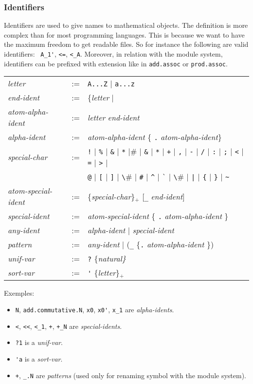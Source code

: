 \subsubsection*{Identifiers}

Identifiers are used to give names to mathematical objects. The definition is
more complex than for most programming languages. This is because we want to
have the maximum freedom to get readable files. So for instance the following
are valid identifiers: \verb# A_1'#, \verb#<=#, \verb#<_A#. Moreover, in
relation with the module system, identifiers can be prefixed with extension
like in \verb#add.assoc# or \verb#prod.assoc#.

\begin{tabular}{lcl}
{\it letter} &:=& \verb#A...Z# $|$ \verb#a...z#
\\
{\it end-ident}&:=&\{{\it letter} $|$ \verb#0...9# $|$ \verb#_# \} \{ \verb#'# \}
\\
{\it atom-alpha-ident} &:=& {\it letter} {\it end-ident} 
\\
{\it alpha-ident} &:=& {\it atom-alpha-ident} \{ \verb#.# {\it
  atom-alpha-ident}\}
\\
{\it special-char} &:=& \verb#!# $|$ \verb#%# $|$ \verb#&# $|$ \verb#*# $|$
  \verb#+# $|$ \verb#,# $|$ \verb#-# $|$ \verb#/# $|$ \verb#:# $|$ \verb#;# $|$
  \verb#<# $|$ \verb#=# $|$ \verb#># $|$ \\
                   & & \verb#@# $|$ \verb#[# $|$ \verb#]# $|$ \verb#\# $|$ \verb+#+ $|$
   \verb#^# $|$ \verb#`# $|$ \verb#\# $|$ \verb#|# $|$
\verb#{# $|$ \verb#}# $|$
  \verb#~#
\\
{\it atom-special-ident} &:=& \{{\it special-char}\}$_+$ [\verb#_# {\it
  end-ident}]
\\
{\it special-ident} &:=& {\it atom-special-ident} \{ \verb#.# {\it
  atom-alpha-ident} \}
\\
{\it any-ident} &:=& {\it alpha-ident} $|$ {\it special-ident}
\\
{\it pattern} &:=& {\it any-ident} $|$ (\verb#_# \{\verb#.# {\it
  atom-alpha-ident} \})
\\
{\it unif-var} &:=& \verb#?# \{\it natural\}
\\
{\it sort-var} &:=& \verb#'# \{{\it letter}\}$_+$
\end{tabular}

\medskip
\noindent Exemples:
\begin{itemize}
\item \verb#N#, \verb#add.commutative.N#, \verb#x0#, \verb#x0'#,
\verb#x_1#
are {\it alpha-idents}.
\item \verb#<#, \verb#<<#, \verb#<_1#, \verb#+#, \verb#+_N# are
{\it special-idents}.
\item \verb#?1# is a {\it unif-var}.
\item \verb#'a# is a {\it sort-var}.
\item \verb#+#, \verb#_.N# are   {\it patterns} (used only for renaming
symbol with the module system).
\end{itemize}


